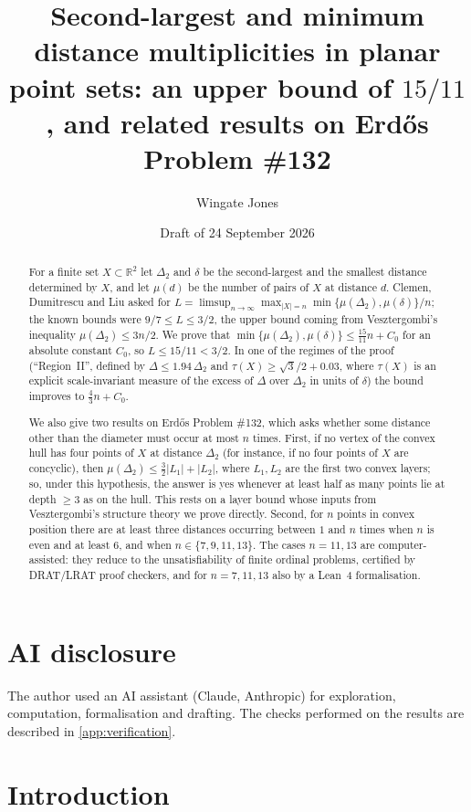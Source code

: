 \documentclass[11pt]{amsart}
\title[Second-largest and minimum distance multiplicities]{Second-largest and minimum distance multiplicities in planar point sets: an upper bound of $15/11$, and related results on Erd\H{o}s Problem \#132}
\author{Wingate Jones}
\date{Draft of 24 September 2026}
\theoremstyle{definition}
\theoremstyle{remark}
\newcommand{\R}{\mathbb{R}}
\newcommand{\Dt}{\Delta_2}
\newcommand{\mult}{\mu}
\begin{document}
\begin{abstract}
For a finite set $X\subset\R^2$ let $\Dt$ and $\delta$ be the second-largest and the smallest distance determined by $X$, and let $\mult(d)$ be the number of pairs of $X$ at distance $d$. Clemen, Dumitrescu and Liu asked for
$L=\limsup_{n\to\infty}\max_{|X|=n}\min\{\mult(\Dt),\mult(\delta)\}/n$; the known bounds were $9/7\le L\le 3/2$, the upper bound coming from Vesztergombi's inequality $\mult(\Dt)\le 3n/2$. We prove that $\min\{\mult(\Dt),\mult(\delta)\}\le \tfrac{15}{11}n+C_0$ for an absolute constant $C_0$, so $L\le 15/11<3/2$. In one of the regimes of the proof (``Region~II'', defined by $\Delta\le1.94\,\Dt$ and $\tau(X)\ge\sqrt3/2+0.03$, where $\tau(X)$ is an explicit scale-invariant measure of the excess of $\Delta$ over $\Dt$ in units of $\delta$) the bound improves to $\tfrac43n+C_0$.

We also give two results on Erd\H{o}s Problem \#132, which asks whether some distance other than the diameter must occur at most $n$ times. First, if no vertex of the convex hull has four points of $X$ at distance $\Dt$ (for instance, if no four points of $X$ are concyclic), then $\mult(\Dt)\le\tfrac32|L_1|+|L_2|$, where $L_1,L_2$ are the first two convex layers; so, under this hypothesis, the answer is yes whenever at least half as many points lie at depth $\ge 3$ as on the hull. This rests on a layer bound whose inputs from Vesztergombi's structure theory we prove directly. Second, for $n$ points in convex position there are at least three distances occurring between $1$ and $n$ times when $n$ is even and at least $6$, and when $n\in\{7,9,11,13\}$. The cases $n=11,13$ are computer-assisted: they reduce to the unsatisfiability of finite ordinal problems, certified by DRAT/LRAT proof checkers, and for $n=7,11,13$ also by a Lean~4 formalisation.
\end{abstract}

\maketitle

\section*{AI disclosure}
The author used an AI assistant (Claude, Anthropic) for exploration, computation, formalisation and drafting. The checks performed on the results are described in \cref{app:verification}.

\section{Introduction}\label{sec:intro}
\end{document}
